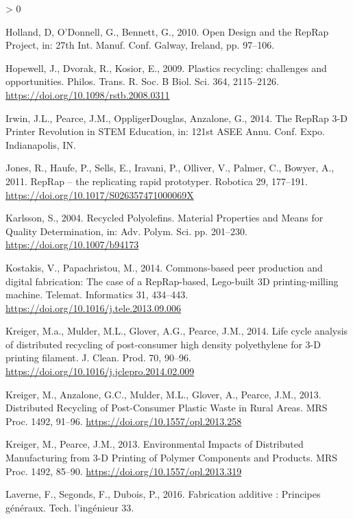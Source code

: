 \documentclass[
]{article}
\newlength{\cslhangindent}
\newenvironment{CSLReferences}[2] %
 {%
  \setlength{\parindent}{0pt}
  \ifodd #1 \everypar{\setlength{\hangindent}{\cslhangindent}}\ignorespaces\fi
  \ifnum #2 > 0
  \setlength{\parskip}{#2\baselineskip}
  \fi
 }%
 {}
\begin{document}
\begin{CSLReferences}{1}{0}
\leavevmode\hypertarget{ref-Holland2010}{}%
Holland, D, O'Donnell, G., Bennett, G., 2010. {Open Design and the
RepRap Project}, in: 27th Int. Manuf. Conf. Galway, Ireland, pp.
97--106.

\leavevmode\hypertarget{ref-Hopewell2009}{}%
Hopewell, J., Dvorak, R., Kosior, E., 2009. {Plastics recycling:
challenges and opportunities}. Philos. Trans. R. Soc. B Biol. Sci. 364,
2115--2126. \url{https://doi.org/10.1098/rstb.2008.0311}

\leavevmode\hypertarget{ref-Irwin2014}{}%
Irwin, J.L., Pearce, J.M., OppligerDouglas, Anzalone, G., 2014. {The
RepRap 3-D Printer Revolution in STEM Education}, in: 121st ASEE Annu.
Conf. Expo. Indianapolis, IN.

\leavevmode\hypertarget{ref-Jones2011}{}%
Jones, R., Haufe, P., Sells, E., Iravani, P., Olliver, V., Palmer, C.,
Bowyer, A., 2011. {RepRap -- the replicating rapid prototyper}. Robotica
29, 177--191. \url{https://doi.org/10.1017/S026357471000069X}

\leavevmode\hypertarget{ref-Karlsson2004}{}%
Karlsson, S., 2004. {Recycled Polyolefins. Material Properties and Means
for Quality Determination}, in: Adv. Polym. Sci. pp. 201--230.
\url{https://doi.org/10.1007/b94173}

\leavevmode\hypertarget{ref-Kostakis2013}{}%
Kostakis, V., Papachristou, M., 2014. {Commons-based peer production and
digital fabrication: The case of a RepRap-based, Lego-built 3D
printing-milling machine}. Telemat. Informatics 31, 434--443.
\url{https://doi.org/10.1016/j.tele.2013.09.006}

\leavevmode\hypertarget{ref-Kreiger2014}{}%
Kreiger, M.a., Mulder, M.L., Glover, A.G., Pearce, J.M., 2014. {Life
cycle analysis of distributed recycling of post-consumer high density
polyethylene for 3-D printing filament}. J. Clean. Prod. 70, 90--96.
\url{https://doi.org/10.1016/j.jclepro.2014.02.009}

\leavevmode\hypertarget{ref-Anzalone2013}{}%
Kreiger, M., Anzalone, G.C., Mulder, M.L., Glover, A., Pearce, J.M.,
2013. {Distributed Recycling of Post-Consumer Plastic Waste in Rural
Areas}. MRS Proc. 1492, 91--96.
\url{https://doi.org/10.1557/opl.2013.258}

\leavevmode\hypertarget{ref-Kreiger2013}{}%
Kreiger, M., Pearce, J.M., 2013. {Environmental Impacts of Distributed
Manufacturing from 3-D Printing of Polymer Components and Products}. MRS
Proc. 1492, 85--90. \url{https://doi.org/10.1557/opl.2013.319}

\leavevmode\hypertarget{ref-Laverne2016}{}%
Laverne, F., Segonds, F., Dubois, P., 2016. {Fabrication additive :
Principes g{é}n{é}raux}. Tech. l'ing{é}nieur 33.


\end{CSLReferences}
\end{document}
